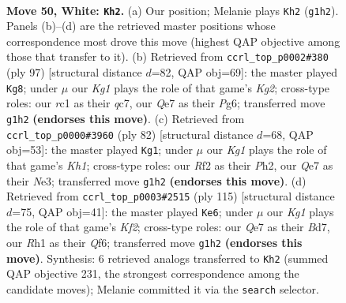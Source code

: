\documentclass[11pt]{article}
\begin{document}
\clearpage

\begin{figure}[p]\centering
\begin{subfigure}{0.46\textwidth}\centering
\resizebox{\linewidth}{!}{%
\newchessgame
\chessboard[
  setfen={5nk1/1p2Q2p/8/3q3p/8/6N1/5R2/2r3KR w - - 12 50},
  showmover=false,
  pgfstyle=straightmove, color=movearrow, markmove={g1-h2}
]}
\caption{}
\end{subfigure}\hfill
\begin{subfigure}{0.46\textwidth}\centering
\resizebox{\linewidth}{!}{%
\newchessgame
\chessboard[
  setfen={8/2Q3k1/6pp/PNP5/5r1P/4q1b1/8/6RK b - - 7 49},
  showmover=false,
  pgfstyle=straightmove, color=movearrow, markmove={g7-g8}
]}
\caption{}
\end{subfigure}
\\[4pt]
\begin{subfigure}{0.46\textwidth}\centering
\resizebox{\linewidth}{!}{%
\newchessgame
\chessboard[
  setfen={8/4p2k/4b2p/2Q5/1n2q1p1/4N3/7P/5R1K w - - 1 42},
  showmover=false,
  pgfstyle=straightmove, color=movearrow, markmove={h1-g1}
]}
\caption{}
\end{subfigure}\hfill
\begin{subfigure}{0.46\textwidth}\centering
\resizebox{\linewidth}{!}{%
\newchessgame
\chessboard[
  setfen={8/3b1kr1/5q2/2pp3Q/8/5PRP/P6K/3N4 b - - 0 58},
  showmover=false,
  pgfstyle=straightmove, color=movearrow, markmove={f7-e6}
]}
\caption{}
\end{subfigure}
\caption{\textbf{Move 50, White: \texttt{Kh2}.} (a) Our position; Melanie plays \texttt{Kh2} (\texttt{g1h2}). Panels (b)--(d) are the retrieved master positions whose correspondence most drove this move (highest QAP objective among those that transfer to it). (b) Retrieved from \texttt{ccrl\_top\_p0002\#380} (ply 97) [structural distance $d$=82, QAP obj=69]: the master played \texttt{Kg8}; under $\mu$ our \emph{Kg1} plays the role of that game's \emph{Kg2}; cross-type roles: our \emph{r}c1 as their \emph{q}c7, our \emph{Q}e7 as their \emph{P}g6; transferred move \texttt{g1h2} \textbf{(endorses this move)}. (c) Retrieved from \texttt{ccrl\_top\_p0000\#3960} (ply 82) [structural distance $d$=68, QAP obj=53]: the master played \texttt{Kg1}; under $\mu$ our \emph{Kg1} plays the role of that game's \emph{Kh1}; cross-type roles: our \emph{R}f2 as their \emph{P}h2, our \emph{Q}e7 as their \emph{N}e3; transferred move \texttt{g1h2} \textbf{(endorses this move)}. (d) Retrieved from \texttt{ccrl\_top\_p0003\#2515} (ply 115) [structural distance $d$=75, QAP obj=41]: the master played \texttt{Ke6}; under $\mu$ our \emph{Kg1} plays the role of that game's \emph{Kf2}; cross-type roles: our \emph{Q}e7 as their \emph{B}d7, our \emph{R}h1 as their \emph{Q}f6; transferred move \texttt{g1h2} \textbf{(endorses this move)}. Synthesis: 6 retrieved analogs transferred to \texttt{Kh2} (summed QAP objective 231, the strongest correspondence among the candidate moves); Melanie committed it via the \texttt{search} selector.}
\label{fig:thought-m98}
\end{figure}
\end{document}
